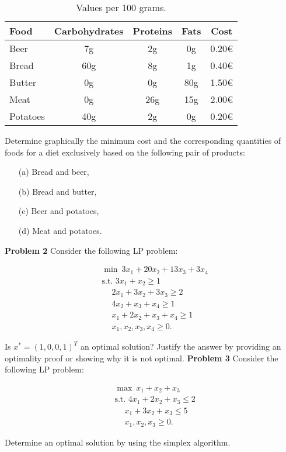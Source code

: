 \documentclass{article}
\begin{document}
\begin{table}[h]
\centering
\caption{Values per 100 grams.}
\begin{tabular}{lcccc}
\toprule
Food    & Carbohydrates & Proteins & Fats & Cost \\
\midrule
Beer    & 7g    & 2g    & 0g   & 0.20€ \\
Bread    & 60g    & 8g    & 1g   & 0.40€ \\
Butter    & 0g    & 0g    & 80g   & 1.50€ \\
Meat    & 0g    & 26g    & 15g   & 2.00€ \\
Potatoes & 40g    & 2g    & 0g   & 0.20€ \\
\bottomrule
\end{tabular}
\end{table}

Determine graphically the minimum cost and the corresponding quantities of foods for a diet exclusively based on the following pair of products:

\begin{enumerate}
    \item[(a)] Bread and beer,
    \item[(b)] Bread and butter,
    \item[(c)] Beer and potatoes,
    \item[(d)] Meat and potatoes.
\end{enumerate}
\textbf{Problem 2} 
Consider the following LP problem:

\[
\begin{aligned}
&\min \ 3x_1 + 20x_2 + 13x_3 + 3x_4 \\
&\text{s.t. } 3x_1 + x_2 \geq 1 \\
&\quad \ 2x_1 + 3x_2 + 3x_3 \geq 2 \\
&\quad \ 4x_2 + x_3 + x_4 \geq 1 \\
&\quad \ x_1 + 2x_2 + x_3 + x_4 \geq 1 \\
&\quad \ x_1, x_2, x_3, x_4 \geq 0.
\end{aligned}
\]

Is \( x^* = (1, 0, 0, 1)^T \) an optimal solution? Justify the answer by providing an optimality proof or showing why it is not optimal.
\newpage
\textbf{Problem 3}
Consider the following LP problem:

\[
\begin{aligned}
&\max \ x_1 + x_2 + x_3 \\
&\text{s.t. } 4x_1 + 2x_2 + x_3 \leq 2 \\
&\quad \ x_1 + 3x_2 + x_3 \leq 5 \\
&\quad \ x_1, x_2, x_3 \geq 0.
\end{aligned}
\]

Determine an optimal solution by using the simplex algorithm.
\end{document}
